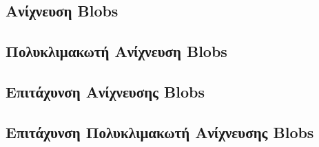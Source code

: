 \documentclass{article}
\newcommand{\eng}[1]{\foreignlanguage{english}{#1}}
\begin{document}
\subsection{Ανίχνευση \eng{Blobs}}



\subsection{Πολυκλιμακωτή Ανίχνευση \eng{Blobs}}


\subsection{Επιτάχυνση Ανίχνευσης \eng{Blobs}}



\subsection{Επιτάχυνση Πολυκλιμακωτή Ανίχνευσης \eng{Blobs}}
\end{document}
